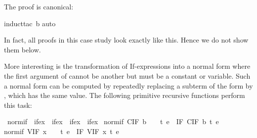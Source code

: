 \begin{isabellebody}
\isadelimproof
%
\endisadelimproof
%
\isatagproof
%
\begin{isamarkuptxt}%
\noindent
The proof is canonical:%
\end{isamarkuptxt}%
\isamarkuptrue%
\isamarkupfalse%
{}induct{}tac\ b{}\isanewline
{}\isamarkupfalse%
{}auto{}\isanewline
{}\isamarkupfalse%
%
\endisatagproof
{\isafoldproof}%
%
\isadelimproof
%
\endisadelimproof
%
\begin{isamarkuptext}%
\noindent
In fact, all proofs in this case study look exactly like this. Hence we do
not show them below.

More interesting is the transformation of If-expressions into a normal form
where the first argument of  cannot be another  but
must be a constant or variable. Such a normal form can be computed by
repeatedly replacing a subterm of the form  by
, which has the same value. The following
primitive recursive functions perform this task:%
\end{isamarkuptext}%
\isamarkuptrue%
\isamarkupfalse%
\ normif\ {}{}\ {}ifex\ {}\ ifex\ {}\ ifex\ {}\ ifex{}\ \isanewline
{}normif\ {}CIF\ b{}\ \ \ \ t\ e\ {}\ IF\ {}CIF\ b{}\ t\ e{}\ {}\isanewline
{}normif\ {}VIF\ x{}\ \ \ \ t\ e\ {}\ IF\ {}VIF\ x{}\ t\ e{}\ {}\isanewline

\end{isabellebody}
